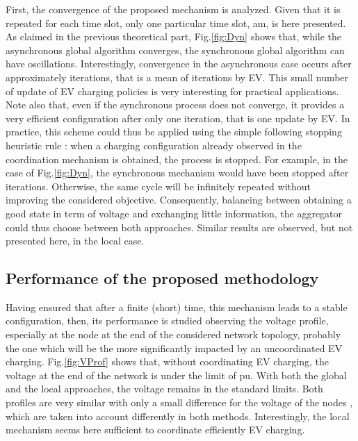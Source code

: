 \documentclass[journal]{IEEEtran}
\begin{document}
First, the convergence of the proposed mechanism is analyzed. Given that it is repeated for each time slot, only one particular time slot,  am, is here presented. As claimed in the previous theoretical part, Fig.\ref{fig:Dyn} shows that, while the asynchronous global algorithm converges, the synchronous global algorithm can have oscillations. Interestingly, convergence in the asynchronous case occurs after approximately  iterations, that is a mean of  iterations by EV. This small number of update of EV charging policies is very interesting for practical applications. Note also that, even if the synchronous process does not converge, it provides a very efficient configuration after only one iteration, that is one update by EV. In practice, this scheme could thus be applied using the simple following stopping heuristic rule : when a charging configuration already observed in the coordination mechanism is obtained, the process is stopped. For example, in the case of Fig.\ref{fig:Dyn}, the synchronous mechanism would have been stopped after  iterations. Otherwise, the same cycle will be infinitely repeated without improving the considered objective. Consequently, balancing between obtaining a good state in term of voltage and exchanging little information, the aggregator could thus choose between both approaches. Similar results are observed, but not presented here, in the local case.   




\subsection{Performance of the proposed methodology}


Having ensured that after a finite (short) time, this mechanism leads to a stable configuration, then, its performance is studied observing the voltage profile, especially at the node  at the end of the considered network topology, probably the one which will be the more significantly impacted by an uncoordinated EV charging. Fig.\ref{fig:VProf} shows that, without coordinating EV charging, the voltage at the end of the network is under the limit of  pu. With both the global and the local approaches, the voltage remains in the standard limits. Both profiles are very similar with only a small difference for the voltage of the nodes , which are taken into account differently in both methods. Interestingly, the local mechanism seems here sufficient to coordinate efficiently EV charging. 
\end{document}
